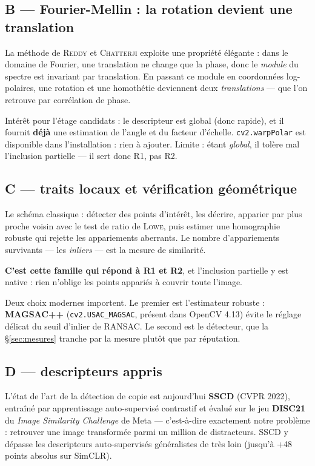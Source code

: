\documentclass[11pt,a4paper]{article}
\newcommand{\bon}[1]{\textcolor{vert}{\textbf{#1}}}
\begin{document}
\subsection{B — Fourier-Mellin : la rotation devient une translation}

La méthode de \textsc{Reddy} et \textsc{Chatterji} exploite une propriété
élégante : dans le domaine de Fourier, une translation ne change que la phase,
donc le \emph{module} du spectre est invariant par translation. En passant ce
module en coordonnées log-polaires, une rotation et une homothétie deviennent
deux \emph{translations} — que l'on retrouve par corrélation de phase.

Intérêt pour l'étage candidats : le descripteur est global (donc rapide), et il
fournit \textbf{déjà} une estimation de l'angle et du facteur d'échelle.
\texttt{cv2.warpPolar} est disponible dans l'installation : rien à ajouter.
Limite : étant \emph{global}, il tolère mal l'inclusion partielle — il sert donc
R1, pas R2.

\subsection{C — traits locaux et vérification géométrique}

Le schéma classique : détecter des points d'intérêt, les décrire, apparier par
plus proche voisin avec le test de ratio de \textsc{Lowe}, puis estimer une
homographie robuste qui rejette les appariements aberrants. Le nombre
d'appariements survivants — les \emph{inliers} — est la mesure de similarité.

\bon{C'est cette famille qui répond à R1 et R2}, et l'inclusion partielle y est
native : rien n'oblige les points appariés à couvrir toute l'image.

Deux choix modernes importent. Le premier est l'estimateur robuste :
\textbf{MAGSAC++} (\texttt{cv2.\allowbreak USAC\_\allowbreak MAGSAC}, présent dans OpenCV 4.13) évite le
réglage délicat du seuil d'inlier de RANSAC. Le second est le détecteur, que la
§\ref{sec:mesures} tranche par la mesure plutôt que par réputation.

\subsection{D — descripteurs appris}

L'état de l'art de la détection de copie est aujourd'hui \textbf{SSCD}
(CVPR 2022), entraîné par apprentissage auto-supervisé contrastif et évalué sur
le jeu \textbf{DISC21} du \emph{Image Similarity Challenge} de Meta — c'est-à-dire
exactement notre problème : retrouver une image transformée parmi un million de
distracteurs. SSCD y dépasse les descripteurs auto-supervisés généralistes de
très loin (jusqu'à +48 points absolus sur SimCLR).
\end{document}
